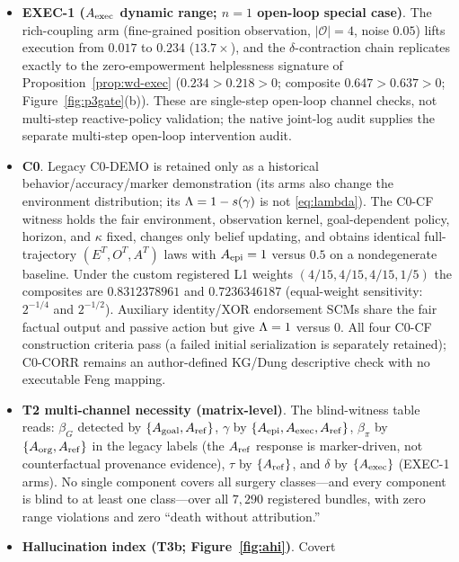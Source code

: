 \begin{itemize}
$\Lam$ marker stay invariant ($\le10^{-12}$). This demonstrates the legacy
$\Ares$-like resilience convention, not current $\Astate$: defense erosion
reduces $\Rdef$ but does not by itself zero current autonomy
(Figure~\ref{fig:p3gate}(a)).
\item \textbf{EXEC-1 ($A_{\mathrm{exec}}$ dynamic range; $n=1$ open-loop special case)}.
The rich-coupling arm (fine-grained position observation, $|\mathcal{O}|=4$,
noise $0.05$) lifts execution from $0.017$ to $0.234$ ($13.7\times$), and the
$\delta$-contraction chain replicates exactly to the zero-empowerment
helplessness signature of Proposition~\ref{prop:wd-exec}
($0.234>0.218>0$; composite $0.647>0.637>0$; Figure~\ref{fig:p3gate}(b)).
These are single-step open-loop channel checks, not multi-step reactive-policy
validation; the native joint-log audit supplies the separate multi-step
open-loop intervention audit.
\item \textbf{C0}. Legacy C0-DEMO is retained only as a historical
behavior/accuracy/marker demonstration (its arms also change the environment
distribution; its $\Lambda=1-s(\gamma)$ is not \eqref{eq:lambda}). The C0-CF
witness holds the fair environment, observation kernel, goal-dependent policy,
horizon, and $\kappa$ fixed, changes only belief updating, and obtains
identical full-trajectory $(E^T,O^T,A^T)$ laws with $A_{\mathrm{epi}}=1$ versus $0.5$ on
a nondegenerate baseline. Under the custom registered L1 weights
$(4/15,4/15,4/15,1/5)$ the composites are $0.8312378961$ and $0.7236346187$
(equal-weight sensitivity: $2^{-1/4}$ and $2^{-1/2}$). Auxiliary identity/XOR
endorsement SCMs share the fair factual output and passive action but give
$\Lambda=1$ versus $0$. All four C0-CF construction criteria pass (a failed
initial serialization is separately retained); C0-CORR remains an
author-defined KG/Dung descriptive check with no executable Feng mapping.
\item \textbf{T2 multi-channel necessity (matrix-level)}. The blind-witness
table reads: $\beta_G$ detected by $\{A_{\mathrm{goal}},A_{\mathrm{ref}}\}$, $\gamma$ by
$\{A_{\mathrm{epi}},A_{\mathrm{exec}},A_{\mathrm{ref}}\}$, $\beta_\pi$ by $\{A_{\mathrm{org}},A_{\mathrm{ref}}\}$ in the legacy
labels (the $A_{\mathrm{ref}}$ response is marker-driven, not counterfactual provenance
evidence), $\tau$ by $\{A_{\mathrm{ref}}\}$, and $\delta$ by $\{A_{\mathrm{exec}}\}$ (EXEC-1 arms).
No single component covers all surgery classes---and every component is blind
to at least one class---over all $7{,}290$ registered bundles, with zero range
violations and zero ``death without attribution.''
\item \textbf{Hallucination index (T3b; Figure~\ref{fig:ahi})}. Covert

\end{itemize}
